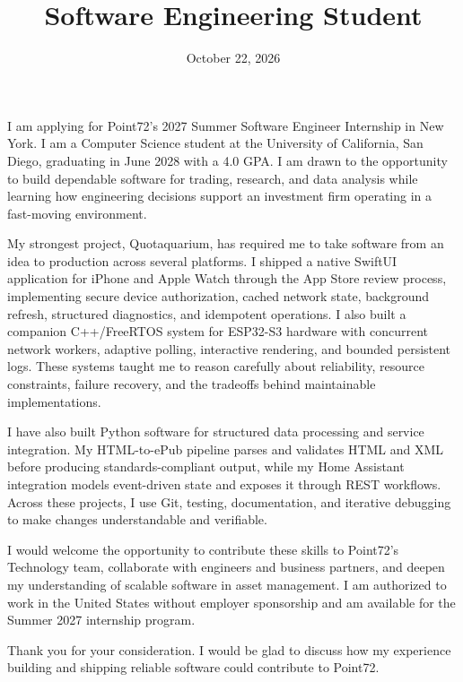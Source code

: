 \documentclass[11pt,a4paper,sans]{moderncv}
\title{Software Engineering Student}
\date{October 22, 2026}
\begin{document}
\makelettertitle

I am applying for Point72's 2027 Summer Software Engineer Internship in New York. I am a Computer Science student at the University of California, San Diego, graduating in June 2028 with a 4.0 GPA. I am drawn to the opportunity to build dependable software for trading, research, and data analysis while learning how engineering decisions support an investment firm operating in a fast-moving environment.

My strongest project, Quotaquarium, has required me to take software from an idea to production across several platforms. I shipped a native SwiftUI application for iPhone and Apple Watch through the App Store review process, implementing secure device authorization, cached network state, background refresh, structured diagnostics, and idempotent operations. I also built a companion C++/FreeRTOS system for ESP32-S3 hardware with concurrent network workers, adaptive polling, interactive rendering, and bounded persistent logs. These systems taught me to reason carefully about reliability, resource constraints, failure recovery, and the tradeoffs behind maintainable implementations.

I have also built Python software for structured data processing and service integration. My HTML-to-ePub pipeline parses and validates HTML and XML before producing standards-compliant output, while my Home Assistant integration models event-driven state and exposes it through REST workflows. Across these projects, I use Git, testing, documentation, and iterative debugging to make changes understandable and verifiable.

I would welcome the opportunity to contribute these skills to Point72's Technology team, collaborate with engineers and business partners, and deepen my understanding of scalable software in asset management. I am authorized to work in the United States without employer sponsorship and am available for the Summer 2027 internship program.

Thank you for your consideration. I would be glad to discuss how my experience building and shipping reliable software could contribute to Point72.

\makeletterclosing
\end{document}
